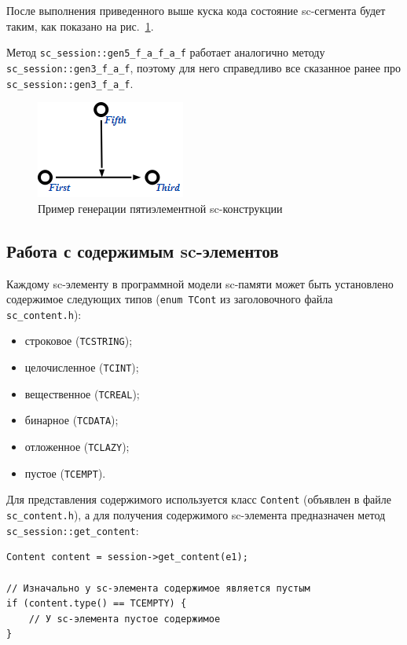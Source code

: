 После выполнения приведенного выше куска кода состояние sc-сегмента
будет таким, как показано на рис.~\ref{fig:gen5_f_a_f_a_f_after}.

Метод \lstinline|sc_session::gen5_f_a_f_a_f| работает аналогично
методу \lstinline|sc_session::gen3_f_a_f|, поэтому для него
справедливо все сказанное ранее про
\lstinline|sc_session::gen3_f_a_f|.

\begin{figure}
  \centering
  \includegraphics{images/4/gen/gen5_f_a_f_a_f_after}
  \caption{Пример генерации пятиэлементной sc-конструкции}
  \label{fig:gen5_f_a_f_a_f_after}
\end{figure}

\subsection{Работа с содержимым sc-элементов}

Каждому sc-элементу в программной модели sc-памяти может быть
установлено содержимое следующих типов (\lstinline|enum TCont| из
заголовочного файла \verb|sc_content.h|):
\begin{itemize}
\item строковое (\lstinline|TCSTRING|);
\item целочисленное (\lstinline|TCINT|);
\item вещественное (\lstinline|TCREAL|);
\item бинарное (\lstinline|TCDATA|);
\item отложенное (\lstinline|TCLAZY|);
\item пустое (\lstinline|TCEMPT|).
\end{itemize}

Для представления содержимого используется класс \lstinline|Content| (объявлен в
файле \verb|sc_content.h|), а для получения содержимого sc-элемента
предназначен метод \lstinline|sc_session::get_content|:

\begin{lstlisting}[texcl]
Content content = session->get_content(e1);

// Изначально у sc-элемента содержимое является пустым
if (content.type() == TCEMPTY) {
    // У sc-элемента пустое содержимое
}
\end{lstlisting}


